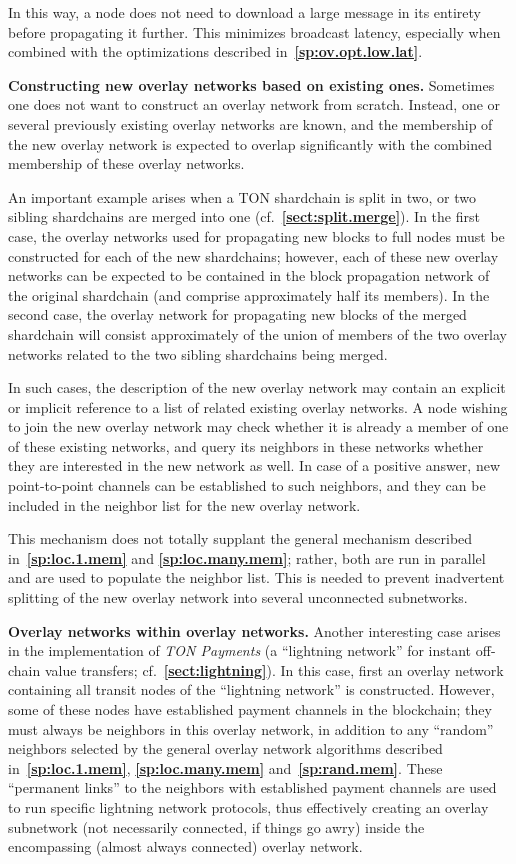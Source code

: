 \documentclass[12pt,oneside]{article}
\def\makepoint#1{\medbreak\noindent{\bf #1.\ }}
\def\nxsubpoint{\refstepcounter{subsubsection}%
  \smallbreak\makepoint{\thesubsubsection}}
\def\refpoint#1{{\rm\textbf{\ref{#1}}}}
\let\ptref=\refpoint
\def\embt(#1.){\textbf{#1.}}
\begin{document}
In this way, a node does not need to download a large message in its
entirety before propagating it further. This minimizes broadcast
latency, especially when combined with the optimizations described
in~\ptref{sp:ov.opt.low.lat}.

\nxsubpoint \embt(Constructing new overlay networks based on existing
ones.)  Sometimes one does not want to construct an overlay network
from scratch. Instead, one or several previously existing overlay
networks are known, and the membership of the new overlay network is
expected to overlap significantly with the combined membership of
these overlay networks.

An important example arises when a TON shardchain is split in two, or
two sibling shardchains are merged into one
(cf.~\ptref{sect:split.merge}). In the first case, the overlay
networks used for propagating new blocks to full nodes must be
constructed for each of the new shardchains; however, each of these
new overlay networks can be expected to be contained in the block
propagation network of the original shardchain (and comprise
approximately half its members). In the second case, the overlay
network for propagating new blocks of the merged shardchain will
consist approximately of the union of members of the two overlay
networks related to the two sibling shardchains being merged.

In such cases, the description of the new overlay network may contain
an explicit or implicit reference to a list of related existing
overlay networks. A node wishing to join the new overlay network may
check whether it is already a member of one of these existing
networks, and query its neighbors in these networks whether they are
interested in the new network as well. In case of a positive answer,
new point-to-point channels can be established to such neighbors, and
they can be included in the neighbor list for the new overlay network.

This mechanism does not totally supplant the general mechanism
described in~\ptref{sp:loc.1.mem} and \ptref{sp:loc.many.mem}; rather,
both are run in parallel and are used to populate the neighbor
list. This is needed to prevent inadvertent splitting of the new
overlay network into several unconnected subnetworks.

\nxsubpoint\label{sp:net.within.net} \embt(Overlay networks within
overlay networks.)  Another interesting case arises in the
implementation of {\em TON Payments} (a ``lightning network'' for
instant off-chain value transfers; cf.~\ptref{sect:lightning}). In
this case, first an overlay network containing all transit nodes of
the ``lightning network'' is constructed. However, some of these nodes
have established payment channels in the blockchain; they must always
be neighbors in this overlay network, in addition to any ``random''
neighbors selected by the general overlay network algorithms described
in~\ptref{sp:loc.1.mem}, \ptref{sp:loc.many.mem}
and~\ptref{sp:rand.mem}. These ``permanent links'' to the neighbors
with established payment channels are used to run specific lightning
network protocols, thus effectively creating an overlay subnetwork
(not necessarily connected, if things go awry) inside the encompassing
(almost always connected) overlay network.
\end{document}
